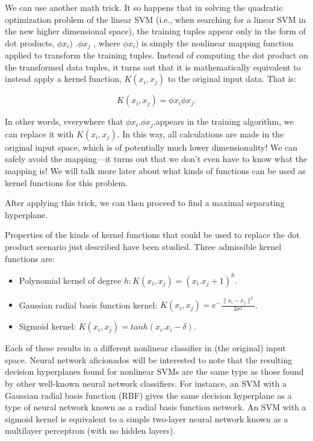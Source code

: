 \documentclass[12pt,fleqn]{book} %
\begin{document}
We can use another math trick. It so happens that in solving the quadratic optimization problem of the linear SVM (i.e., when searching for a linear SVM in the new higher dimensional space), the training tuples appear only in the form of dot products, $\phi{x_i }) $ .$\phi{x_j } $ , where $\phi{x_i }) $ is simply the nonlinear mapping function applied to transform the training tuples. Instead of computing the dot product on the transformed data tuples, it turns out that it is mathematically equivalent to instead apply a kernel function, $K(x_i,x_j )$  to the original input data. That is:
\begin{dBox}
\begin{equation}
K(x_i,x_j) = \phi{x_i} \phi{x_j}.
\end{equation}
\end{dBox}

In other words, everywhere that $\phi{x_i}$.$\phi{x_j}.$appears in the training algorithm, we can replace it with $K(x_i,x_j )$. In this way, all calculations are made in the original input space, which is of potentially much lower dimensionality! We can safely avoid the mapping—it turns out that we don’t even have to know what the mapping is! We will talk more later about what kinds of functions can be used as kernel functions for this problem.

After applying this trick, we can then proceed to find a maximal separating hyperplane.\bigskip

Properties of the kinds of kernel functions that could be used to replace the dot product scenario just described have been studied. Three admissible kernel functions are:

\begin{itemize}
\item Polynomial kernel of degree $h: K(x_i,x_j )=(x_i.x_j+1)^h$.
\item Gaussian radial basis function kernel: $K(x_i,x_j )=e^-\frac{\|x_i- x_j \|^2}{2\sigma^2}$.
\item Sigmoid kernel: $K(x_i,x_j )=tanh(x_i.x_i-\delta)$.
\end{itemize}

Each of these results in a different nonlinear classifier in (the original) input space. Neural network aficionados will be interested to note that the resulting decision hyperplanes found for nonlinear SVMs are the same type as those found by other well-known neural network classifiers. For instance, an SVM with a Gaussian radial basis function (RBF) gives the same decision hyperplane as a type of neural network known as a radial basis function network. An SVM with a sigmoid kernel is equivalent to a simple two-layer neural network known as a multilayer perceptron (with no hidden layers). \bigskip
\end{document}

